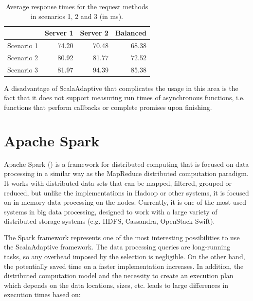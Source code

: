 \begin{table}[h!]
	\centering
	\captionsetup{justification=centering,margin=0.5cm}
		\bgroup
	\def\arraystretch{1.5}%
	
	\begin{tabular}{|l|r|r|r|}
		\hline
		& \textbf{Server 1}& \textbf{Server 2}& \textbf{Balanced}\\ \hline
		Scenario 1 & 74.20             & 70.48             & 68.38             \\ \hline
		Scenario 2 & 80.92             & 81.77             & 72.52             \\ \hline
		Scenario 3 & 81.97             & 94.39             & 85.38             \\ \hline
	\end{tabular}
	\egroup
	\caption{Average response times for the request methods in scenarios 1, 2 and 3 (in ms).}
\label{tab:load_balance_resp_avgs}
\end{table}

A disadvantage of ScalaAdaptive that complicates the usage in this area is the fact that it does not support measuring run times of asynchronous functions, i.e. functions that perform callbacks or complete promises upon finishing.

\section{Apache Spark}

Apache Spark (\cite{noauthor_apache_nodate}) is a framework for distributed computing that is focused on data processing in a similar way as the MapReduce distributed computation paradigm. It works with distributed data sets that can be mapped, filtered, grouped or reduced, but unlike the implementations in Hadoop or other systems, it is focused on in-memory data processing on the nodes. Currently, it is one of the most used systems in big data processing, designed to work with a large variety of distributed storage systems (e.g. HDFS, Cassandra, OpenStack Swift).

The Spark framework represents one of the most interesting possibilities to use the ScalaAdaptive framework. The data processing queries are long-running tasks, so any overhead imposed by the selection is negligible. On the other hand, the potentially saved time on a faster implementation increases. In addition, the distributed computation model and the necessity to create an execution plan which depends on the data locations, sizes, etc. leads to large differences in execution times based on:

